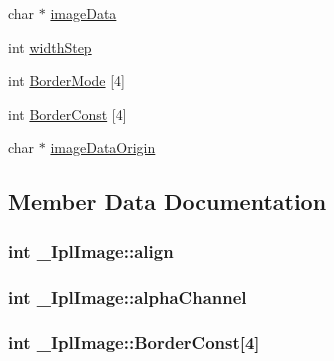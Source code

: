 \begin{DoxyCompactItemize}
\item 
char $\ast$ \hyperlink{struct__IplImage_a8f494e96def4231c3623eead920b3358}{image\-Data}
\item 
int \hyperlink{struct__IplImage_aca744fd03a4a3ccf8b896798a09c2784}{width\-Step}
\item 
int \hyperlink{struct__IplImage_a120beb19f43ba8744daea43544ee75f3}{Border\-Mode} \mbox{[}4\mbox{]}
\item 
int \hyperlink{struct__IplImage_a6931382b6f5aae497ed1d020dba372a3}{Border\-Const} \mbox{[}4\mbox{]}
\item 
char $\ast$ \hyperlink{struct__IplImage_a22b6ea51215650daac5dd9070cea338b}{image\-Data\-Origin}
\end{DoxyCompactItemize}


\subsection{Member Data Documentation}
\hypertarget{struct__IplImage_a8c6319575da9a150894eed1354578163}{
\subsubsection[{align}]{\setlength{\rightskip}{0pt plus 5cm}int \-\_\-\-Ipl\-Image\-::align}}\label{struct__IplImage_a8c6319575da9a150894eed1354578163}
\hypertarget{struct__IplImage_a7d8aece5d2f9236fb1e712ef76f7ceb8}{
\subsubsection[{alpha\-Channel}]{\setlength{\rightskip}{0pt plus 5cm}int \-\_\-\-Ipl\-Image\-::alpha\-Channel}}\label{struct__IplImage_a7d8aece5d2f9236fb1e712ef76f7ceb8}
\hypertarget{struct__IplImage_a6931382b6f5aae497ed1d020dba372a3}{
\subsubsection[{Border\-Const}]{\setlength{\rightskip}{0pt plus 5cm}int \-\_\-\-Ipl\-Image\-::\-Border\-Const\mbox{[}4\mbox{]}}}\label{struct__IplImage_a6931382b6f5aae497ed1d020dba372a3}
